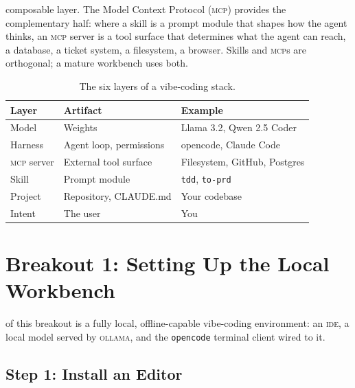 \documentclass{../sharedAssets/tufte}
\begin{document}
 composable layer. The
Model Context Protocol (\textsc{mcp}) provides the
complementary half: where a skill is a prompt module that shapes
how the agent thinks, an \textsc{mcp} server is a tool surface
that determines what the agent can reach, a database, a ticket
system, a filesystem, a browser. Skills and \textsc{mcp}s are
orthogonal; a mature workbench uses both.

\begin{table}[ht]
\begin{tabular}{p{}p{}p{}}
\toprule
\textbf{Layer} & \textbf{Artifact} & \textbf{Example} \\
\midrule
Model        & Weights              & Llama 3.2, Qwen 2.5 Coder \\
Harness      & Agent loop, permissions & opencode, Claude Code \\
\textsc{mcp} server & External tool surface & Filesystem, GitHub, Postgres \\
Skill        & Prompt module        & \texttt{tdd}, \texttt{to-prd} \\
Project      & Repository, CLAUDE.md & Your codebase \\
Intent       & The user             & You \\
\bottomrule
\end{tabular}
\vspace{1em}
\caption{The six layers of a vibe-coding stack.}
\label{tab:layers}
\end{table}

\section{Breakout 1: Setting Up the Local Workbench}
\label{sec:breakout-1}

 of this breakout is a fully local, offline-capable
vibe-coding environment: an \textsc{ide}, a local model served by
\textsc{ollama}, and the \texttt{opencode} terminal client wired to it.

\subsection*{Step 1: Install an Editor}
\end{document}
